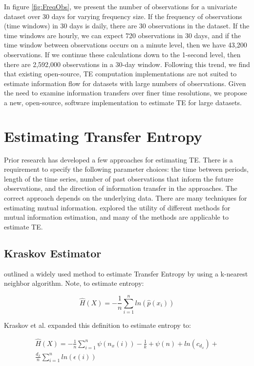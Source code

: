 In figure \ref{fig:FreqObs}, we present the number of observations for a univariate dataset over 30 days for varying frequency size.  If the frequency of observations (time windows) in 30 days is daily,  there are 30 observations in the dataset.  If the time windows are hourly, we can expect 720 observations in 30 days, and if the time window between observations occurs on a minute level, then we have 43,200 observations.  If we continue these calculations down to the 1-second level, then there are 2,592,000 observations in a 30-day window.  Following this trend, we find that existing open-source, TE computation implementations are not suited to estimate information flow for datasets with large numbers of observations.  Given the need to examine information transfers over finer time resolutions, we propose a new, open-source, software implementation to estimate TE for large datasets.

\section{Estimating Transfer Entropy} \label{intro:estimateTE}

Prior research has developed a few approaches for estimating TE. There is a requirement to specify the following parameter choices: the time between periods, length of the time series, number of past observations that inform the future observations, and the direction of information transfer in the approaches. The correct approach depends on the underlying data. There are many techniques for estimating mutual information. \cite{EstimatingTE} explored the utility of different methods for mutual information estimation, and many of the methods are applicable to estimate TE.

\subsection{Kraskov Estimator} \label{intro:Kraskov}


\cite{kraskovEstimator} outlined a widely used method  to estimate Transfer Entropy by using a k-nearest neighbor algorithm.  Note, to estimate entropy:

\begin{equation}
\hat{H}(X) = - \frac{1}{n} \sum^n_{i=1} ln (\hat{p}(x_i)) 
\end{equation}

\noindent Kraskov et al. expanded this definition to estimate entropy to:

\setlength{\arraycolsep}{0.0em}
\begin{eqnarray}
\hat{H}(X) = - \frac{1}{n} \sum^n_{i=1} \psi(n_x(i)) - \frac{1}{k} + \psi(n) + ln (c_{d_x}) + \nonumber\\
 \frac{d_x}{n} \sum^n_{i=1} ln (\epsilon(i))
\end{eqnarray}
\setlength{\arraycolsep}{1pt}

